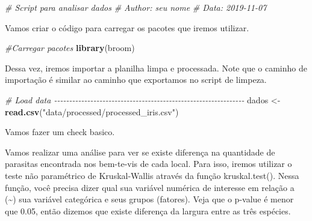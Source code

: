 \documentclass[
]{book}
\newenvironment{Shaded}{\begin{snugshade}}{\end{snugshade}}
\newcommand{\CommentTok}[1]{\textcolor[rgb]{0.56,0.35,0.01}{\textit{#1}}}
\newcommand{\FunctionTok}[1]{\textcolor[rgb]{0.13,0.29,0.53}{\textbf{#1}}}
\newcommand{\NormalTok}[1]{#1}
\newcommand{\OtherTok}[1]{\textcolor[rgb]{0.56,0.35,0.01}{#1}}
\newcommand{\SpecialCharTok}[1]{\textcolor[rgb]{0.81,0.36,0.00}{\textbf{#1}}}
\newcommand{\StringTok}[1]{\textcolor[rgb]{0.31,0.60,0.02}{#1}}
\begin{document}
\begin{Shaded}
\begin{Highlighting}[]

\CommentTok{\# Script para analisar dados}
\CommentTok{\# Author: seu nome}
\CommentTok{\# Data: 2019{-}11{-}07}
\end{Highlighting}
\end{Shaded}

Vamos criar o código para carregar os pacotes que iremos utilizar.

\begin{Shaded}
\begin{Highlighting}[]

\CommentTok{\#Carregar pacotes}
\FunctionTok{library}\NormalTok{(broom)}
\end{Highlighting}
\end{Shaded}

Dessa vez, iremos importar a planilha limpa e processada. Note que o caminho de importação é similar ao caminho que exportamos no script de limpeza.

\begin{Shaded}
\begin{Highlighting}[]

\CommentTok{\# Load data {-}{-}{-}{-}{-}{-}{-}{-}{-}{-}{-}{-}{-}{-}{-}{-}{-}{-}{-}{-}{-}{-}{-}{-}{-}{-}{-}{-}{-}{-}{-}{-}{-}{-}{-}{-}{-}{-}{-}{-}{-}{-}{-}{-}{-}{-}{-}{-}{-}{-}{-}{-}{-}{-}{-}{-}{-}{-}{-}{-}{-}{-}{-}}
\NormalTok{dados }\OtherTok{\textless{}{-}} \FunctionTok{read.csv}\NormalTok{(}\StringTok{"data/processed/processed\_iris.csv"}\NormalTok{)}
\end{Highlighting}
\end{Shaded}

Vamos fazer um check basico.

\begin{Shaded}
\end{Shaded}

Vamos realizar uma análise para ver se existe diferença na quantidade de parasitas encontrada nos bem-te-vis de cada local. Para isso, iremos utilizar o teste não paramétrico de Kruskal-Wallis através da função kruskal.test(). Nessa função, você precisa dizer qual sua variável numérica de interesse em relação a (\textasciitilde) sua variável categórica e seus grupos (fatores). Veja que o p-value é menor que 0.05, então dizemos que existe diferença da largura entre as três espécies.
\end{document}
